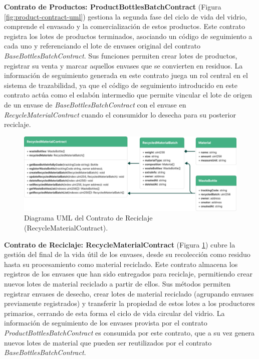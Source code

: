\textbf{Contrato de Productos: ProductBottlesBatchContract} (Figura \ref{fig:product-contract-uml})
 gestiona la segunda fase del ciclo de vida del vidrio, comprende el envasado y la comercialización de estos productos. Este contrato registra los lotes de productos terminados, asociando un código de seguimiento a cada uno y referenciando el lote de envases original del contrato \textit{BaseBottlesBatchContract}. Sus funciones permiten crear lotes de productos, registrar su venta y marcar aquellos envases que se convierten en residuos. La información de seguimiento generada en este contrato juega un rol central en el sistema de trazabilidad, ya que el código de seguimiento introducido en este contrato actúa como el eslabón intermedio que permite vincular el lote de origen de un envase de \textit{BaseBottlesBatchContract} con el envase en \textit{RecycleMaterialContract} cuando el consumidor lo desecha para su posterior reciclaje.

\begin{figure}[!htb]
    \centering
    \includegraphics[width=\linewidth]{Figures/uml-recycling-contract.png}
    \caption{Diagrama UML del Contrato de Reciclaje (RecycleMaterialContract).}
    \label{fig:recycling-contract-uml}
\end{figure}

\textbf{Contrato de Reciclaje: RecycleMaterialContract} (Figura \ref{fig:recycling-contract-uml})
 cubre la gestión del final de la vida útil de los envases, desde su recolección como residuo hasta su procesamiento como material reciclado. Este contrato almacena los registros de los envases que han sido entregados para reciclaje, permitiendo crear nuevos lotes de material reciclado a partir de ellos. Sus métodos permiten registrar envases de desecho, crear lotes de material reciclado (agrupando envases previamente registrados) y transferir la propiedad de estos lotes a los productores primarios, cerrando de esta forma el ciclo de vida circular del vidrio. La información de seguimiento de los envases provista por el contrato \textit{ProductBottlesBatchContract} es consumida por este contrato, que a su vez genera nuevos lotes de material que pueden ser reutilizados por el contrato \textit{BaseBottlesBatchContract}.

